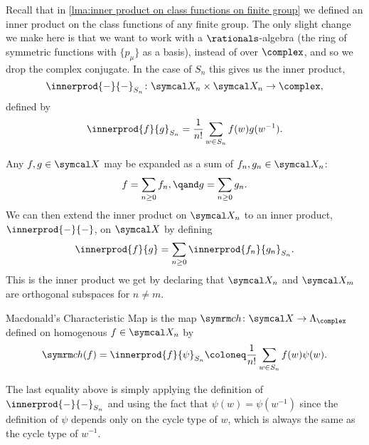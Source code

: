 Recall that in \cref{lma:inner product on class functions on finite group} we defined an inner product on the class functions of any finite group.
The only slight change we make here is that we want to work with a \(\rationals\)-algebra (the ring of symmetric functions with \(\{p_\mu\}\) as a basis), instead of over \(\complex\), and so we drop the complex conjugate.
In the case of \(S_n\) this gives us the inner product,
\begin{equation}
    \innerprod{-}{-}_{S_n} \colon \classFunctions_n \times \classFunctions_n \to \complex,
\end{equation}
defined by
\begin{equation}
    \innerprod{f}{g}_{S_n} = \frac{1}{n!} \sum_{w \in S_n} f(w) g(w^{-1}).
\end{equation}

Any \(f, g \in \classFunctions\) may be expanded as a sum of \(f_n, g_n \in \classFunctions_n\):
\begin{equation}
    f = \sum_{n \ge 0} f_n, \qand g = \sum_{n \ge 0} g_n.
\end{equation}
We can then extend the inner product on \(\classFunctions_n\) to an inner product, \(\innerprod{-}{-}\), on \(\classFunctions\) by defining
\begin{equation}
    \innerprod{f}{g} = \sum_{n\ge 0} \innerprod{f_n}{g_n}_{S_n}.
\end{equation}
This is the inner product we get by declaring that \(\classFunctions_n\) and \(\classFunctions_m\) are orthogonal subspaces for \(n \ne m\).

\begin{dfn}{Macdonald's Characteristic Map}{}
     is the map \(\ch \colon \classFunctions \to \Lambda_{\complex}\) defined on homogenous \(f \in \classFunctions_n\) by
    \begin{equation}
        \ch(f) = \innerprod{f}{\psi}_{S_n} \coloneq \frac{1}{n!} \sum_{w \in S_n} f(w) \psi(w).
    \end{equation}
\end{dfn}

The last equality above is simply applying the definition of \(\innerprod{-}{-}_{S_n}\) and using the fact that \(\psi(w) = \psi(w^{-1})\) since the definition of \(\psi\) depends only on the cycle type of \(w\), which is always the same as the cycle type of \(w^{-1}\).

